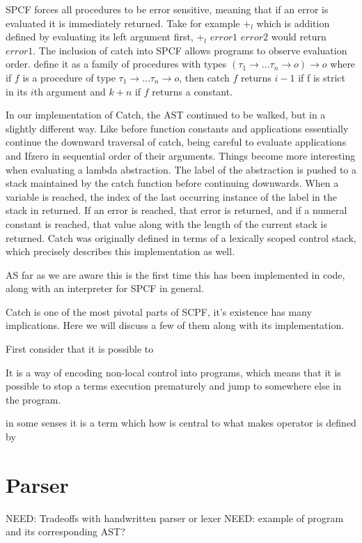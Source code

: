 \documentclass[12pt,a4paper]{report}
\theoremstyle{definition}
\theoremstyle{remark}
\begin{document}
SPCF forces all procedures to be error sensitive, meaning that if an error is evaluated it is immediately returned. Take for example $+_l$ which is addition defined by evaluating its left argument first, $+_l$ $error1$ $error2$ would return $error1$. The inclusion of catch into SPCF allows programs to observe evaluation order. \cite{cartwright_1992} define it as a family of procedures with types $(\tau_1 \rightarrow \dots \tau_n \rightarrow o) \rightarrow o$ where if $f$ is a procedure of type $\tau_1 \rightarrow \dots \tau_n \rightarrow o$, then catch $f$ returns $i - 1$ if f is strict in its $i$th argument and $k+n$ if $f$ returns a constant. 

In our implementation of Catch, the AST continued to be walked, but in a slightly different way. Like before function constants and applications essentially continue the downward traversal of catch, being careful to evaluate applications and Ifzero in sequential order of their arguments. Things become more interesting when evaluating a lambda abstraction. The label of the abstraction is pushed to a stack maintained by the catch function before continuing downwards. When a variable is reached, the index of the last occurring instance of the label in the stack in returned. If an error is reached, that error is returned, and if a numeral constant is reached,  that value along with the length of the current stack is returned. Catch was originally defined in terms of a lexically scoped control stack, which precisely describes this implementation as well.

AS far as we are aware this is the first time this has been implemented in code, along with an interpreter for SPCF in general.

Catch is one of the most pivotal parts of SCPF, it's existence has many implications. Here we will discuss a few of them along with its implementation.

First consider that it is possible to 

It is a way of encoding non-local control into programs, which means that it is possible to stop a terms execution prematurely and jump to somewhere else in the program.

in some senses it  is a term which how  is central to what makes operator is defined by \cite{cartwright_1992}

\section{Parser}
NEED: Tradeoffs with handwritten parser or lexer
NEED: example of program and its corresponding AST?
\end{document}
